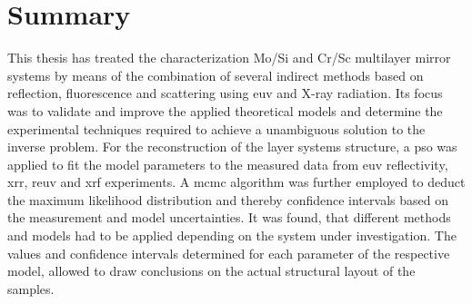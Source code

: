\chapter{Summary} \label{ch_summary}


This thesis has treated the characterization Mo/Si and Cr/Sc multilayer mirror systems by means of the combination of several indirect methods based on reflection, fluorescence and scattering using \gls{euv} and X-ray radiation. Its focus was to validate and improve the applied theoretical models and determine the experimental techniques required to achieve a unambiguous solution to the inverse problem. For the reconstruction of the layer systems structure, a \glsdesc{pso} was applied to fit the model parameters to the measured data from \glsdesc{euv} reflectivity, \glsdesc{xrr}, \glsdesc{reuv} and \glsdesc{xrf} experiments. A \glsdesc{mcmc} algorithm was further employed to deduct the maximum likelihood distribution and thereby confidence intervals based on the measurement and model uncertainties. It was found, that different methods and models had to be applied depending on the system under investigation. The values and confidence intervals determined for each parameter of the respective model, allowed to draw conclusions on the actual structural layout of the samples.


